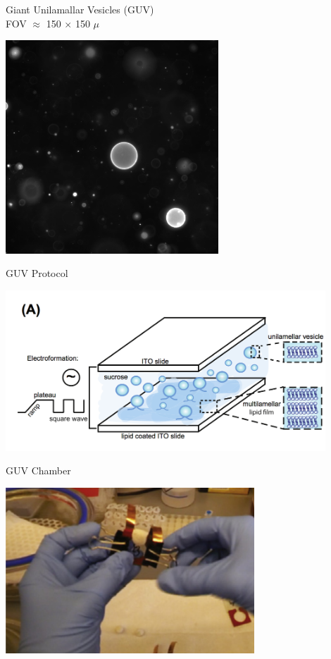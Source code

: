 \documentclass[presentation]{beamer}
\begin{document}
\begin{frame}[label=sec-12]{Giant Unilamallar Vesicles (GUV)\\ FOV $\approx$ 150 $\times$ 150 $\mu$}
\begin{center}
  \includegraphics[width=0.6\textwidth, interpolate=true]{figs/guv.jpg}
\end{center}
\end{frame}
\begin{frame}[label=sec-13]{GUV Protocol}
\begin{center}
  \includegraphics[width=0.9\textwidth, interpolate=true]{figs/schmid2015}
\end{center}
\end{frame}

\begin{frame}[label=sec-14]{GUV Chamber}
\begin{center}
  \includegraphics[width=0.7\textwidth, interpolate=true]{figs/chamber}
\end{center}
\end{frame}
\end{document}
